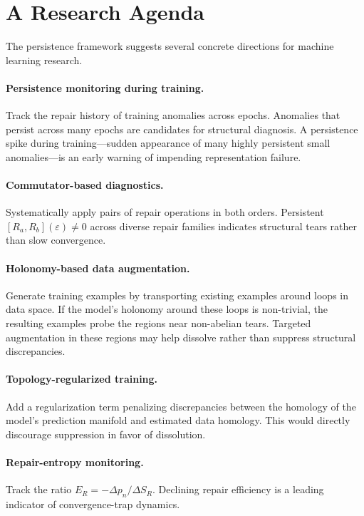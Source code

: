 \documentclass[12pt,oneside]{book}
\theoremstyle{plain}
\theoremstyle{definition}
\theoremstyle{remark}
\newcommand{\eps}{\varepsilon}
\newcommand{\1}{\mathbf{1}}
\begin{document}
\section{A Research Agenda}

The persistence framework suggests several concrete directions for machine learning research.

\paragraph{Persistence monitoring during training.} Track the repair history of training anomalies across epochs. Anomalies that persist across many epochs are candidates for structural diagnosis. A persistence spike during training---sudden appearance of many highly persistent small anomalies---is an early warning of impending representation failure.

\paragraph{Commutator-based diagnostics.} Systematically apply pairs of repair operations in both orders. Persistent $[R_a, R_b](\eps) \neq 0$ across diverse repair families indicates structural tears rather than slow convergence.

\paragraph{Holonomy-based data augmentation.} Generate training examples by transporting existing examples around loops in data space. If the model's holonomy around these loops is non-trivial, the resulting examples probe the regions near non-abelian tears. Targeted augmentation in these regions may help dissolve rather than suppress structural discrepancies.

\paragraph{Topology-regularized training.} Add a regularization term penalizing discrepancies between the homology of the model's prediction manifold and estimated data homology. This would directly discourage suppression in favor of dissolution.

\paragraph{Repair-entropy monitoring.} Track the ratio $E_R = -\Delta p_n / \Delta S_R$. Declining repair efficiency is a leading indicator of convergence-trap dynamics.
\end{document}
